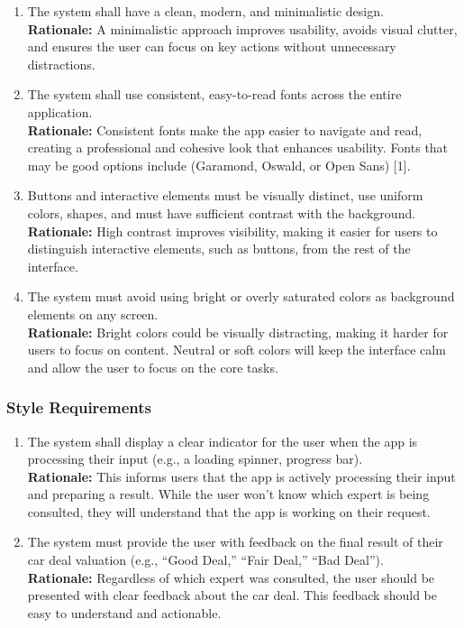 \documentclass[]{article}
\begin{document}
\begin{enumerate}
\begin{enumerate}[{LF-A}1.]
    \item The system shall have a clean, modern, and minimalistic design.  \\
    \textbf{Rationale:} A minimalistic approach improves usability, avoids visual clutter, and ensures the user can focus on key actions without unnecessary distractions.

    \item The system shall use consistent, easy-to-read fonts across the entire application. \\ 
    \textbf{Rationale:} Consistent fonts make the app easier to navigate and read, creating a professional and cohesive look that enhances usability. Fonts that may be good options include (Garamond, Oswald, or Open Sans) [1].

    \item  Buttons and interactive elements must be visually distinct, use uniform colors, shapes, and must have sufficient contrast with the background. \\ 
    \textbf{Rationale:} High contrast improves visibility, making it easier for users to distinguish interactive elements, such as buttons, from the rest of the interface.

    \item The system must avoid using bright or overly saturated colors as background elements on any screen.  \\
    \textbf{Rationale:} Bright colors could be visually distracting, making it harder for users to focus on content. Neutral or soft colors will keep the interface calm and allow the user to focus on the core tasks.
\end{enumerate}

\subsubsection{Style Requirements}
\label{ssub:style_requirements}
\begin{enumerate}[{LF-S}1.]
    \item The system shall display a clear indicator for the user when the app is processing their input (e.g., a loading spinner, progress bar). \\
    \textbf{Rationale:} This informs users that the app is actively processing their input and preparing a result. While the user won't know which expert is being consulted, they will understand that the app is working on their request.
    
    \item The system must provide the user with feedback on the final result of their car deal valuation (e.g., “Good Deal,” “Fair Deal,” “Bad Deal”).  \\
    \textbf{Rationale:} Regardless of which expert was consulted, the user should be presented with clear feedback about the car deal. This feedback should be easy to understand and actionable.


\end{enumerate}
\end{enumerate}
\end{document}
